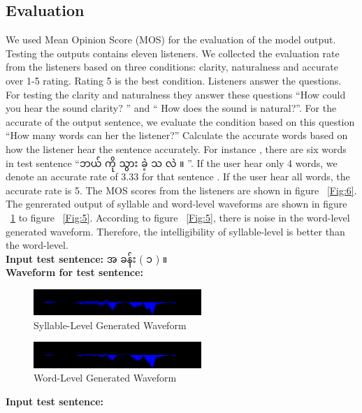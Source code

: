 \documentclass[journal,transmag]{JIISTjrnl}
\newcommand{\enquote}[1]{``#1''}
\begin{document}
\subsection{Evaluation}
We used Mean Opinion Score (MOS) for the evaluation of the model output. Testing the outputs contains eleven listeners. We collected the evaluation rate from the listeners based on  three conditions: clarity, naturalness and accurate over 1-5 rating. Rating 5 is the best condition. Listeners answer the questions. For testing the clarity and naturalness they answer these questions \enquote{How could you hear the sound clarity? } and \enquote{ How does the sound is natural?}. For the accurate of the output sentence, we evaluate the condition based on this question \enquote{How many words can her the listener?} Calculate the accurate words based on how the listener hear the sentence accurately. For instance , there are six words in test sentence \enquote{{\padauktext ဘယ် ကို သွား ခဲ့ သ လဲ ။ }}. If the user hear only 4 words, we denote an accurate rate of 3.33 for that sentence . If the user hear all words, the accurate rate is 5. The MOS scores from the listeners are shown in figure ~\ref{Fig:6}. The genrerated output of syllable and word-level waveforms  are shown in figure ~\ref{Fig:2} to figure ~\ref{Fig:5}. According to figure ~\ref{Fig:5}, there is noise in the word-level generated waveform. Therefore, the intelligibility of syllable-level is better than the word-level. \\
\textbf{Input test sentence:}\hspace{7mm} {\padauktext အ ခန်း ( ၁ ) ။}\\
\textbf {Waveform for test sentence:}
\begin{figure}[H]
\centering
\includegraphics[width=2.5in]{Q1.png}
\caption{Syllable-Level Generated Waveform}
\label{Fig:2}
\end{figure}
\begin{figure}[H]
\centering
\includegraphics[width=2.5in]{wq1.png}
\caption{Word-Level Generated Waveform}
\label{Fig:3}
\end{figure}
\textbf{Input test sentence:}\hspace{7mm}{\padauktext ဘယ် ကို သွား ခဲ့ သ လဲ ။}\\
\end{document}
